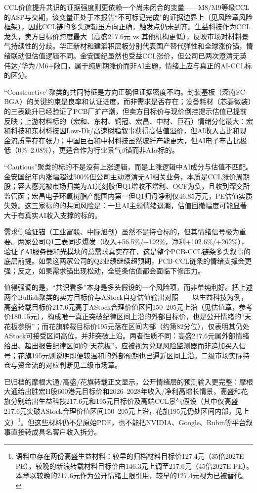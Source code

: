 CCL价值提升共识的证据强度则更依赖一个尚未闭合的变量——M8/M9等级CCL的ASP与交期，该变量正处于本报告``不可标记完成''的证据边界上（见风险章风险框架），因此CCL链的多头逻辑虽方向正确，触发点仍未到齐。生益科技作为CCL龙头，卖方目标价跨度最大（高盛217.6元 vs 其他机构更低），反映市场对材料景气持续性的分歧。华正新材和建滔积层板分别代表国产替代弹性和全球涨价锚，情绪联动但估值逻辑不同。金安国纪虽然也受益CCL涨价，但公司已两次澄清无英伟达/华为/M6+敞口，属于纯周期涨价而非AI主题，情绪上应与真正的AI-CCL标的区分。

``Constructive''聚类的共同特征是方向正确但证据密度不均。封装基板（深南FC-BGA）的关键约束是良率和认证进度，而非需求是否存在；设备耗材（芯碁微装）的三表跳升已经验证了PCB厂扩产潮，但卖方目标价与现价倒挂提示估值已提前反映；上游材料标的（宏和、东材、铜冠、宏昌、中材、巨石）情绪分化最大：宏和科技和东材科技因Low-Dk/高速树脂叙事获得高估值溢价，但AI收入占比和现金流质量存在张力；中国巨石和中材科技虽然玻纤产能更大，但AI电子布占比极低（0\%--2.08\%），更适合作为行业景气$\beta$锚而非AI$\alpha$标的。

``Cautious''聚类的标的不是没有上涨逻辑，而是上涨逻辑中AI成分与估值不匹配。金安国纪年内涨幅超过500\%但公司主动澄清无AI相关业务，本质是CCL涨价周期股；容大感光被市场归类为AI光刻胶但Q1增收不增利、OCF为负，且收到深交所监管函；宏昌电子环氧树脂产能国内第一但Q1归母净利仅46.85万元，PE估值实质失效。这三家标的的共同风险是：一旦AI主题情绪退潮，估值回撤幅度可能显著大于有真实AI收入支撑的标的。

需求侧验证锚（工业富联、中际旭创）虽然不是持仓标的，但其情绪信号极为重要。两家公司Q1三表同步爆发（收入+56.5\%/+192\%，净利+102.6\%/+262\%），验证了AI服务器和光模块的总需求真实存在，这是整个PCB-CCL链条多头叙事的底层前提。如果这两家公司的Q2业绩继续超预期，PCB-CCL链条的情绪支撑会更强；反之，如果需求锚出现松动，全链条估值都会面临下修压力。

值得强调的是，``共识看多''本身是多头假设的一个风险项，而非单纯利好。把上述两个Bullish聚类的卖方目标价与AStock自身估值输出对照——以生益科技为例，高盛转载目标价217.6元高于AStock合理价值区间150--205元上沿（见估值章，参考价180.15元），构成唯一真正突破纪律区间上沿的外部目标价，也是公开情绪的``天花板参照''；而花旗转载目标价195元落在区间内部（约第82分位），仅表明其仍处AStock可接受区间高位，并非突破上沿。两者性质不同：高盛217.6元属外部情绪给出、超出报告纪律区间的``天花板''，应被视为兑现风险监测器而非追加买入信号；花旗195元则说明即便较温和的外部预期也已逼近区间上沿。二级市场实际持仓与资金流的对应判断见二级市场章。

已归档的摩根大通/高盛/花旗转载正文显示，公开情绪层的预测输入更完整：摩根大通给出胜宏H股600港元目标价和2026--2028年收入/净利高增长情景，高盛和花旗分别给出生益科技217.6元和195元目标价及高端CCL景气假设（其中仅高盛217.6元突破AStock合理价值区间150--205元上沿，花旗195元仍处区间内部，见上文）\footnote{语料中存在两份高盛生益材料：较早的归档材料目标价127.4元（35倍2027E PE），较晚的新浪转载材料目标价由146.3元上调至217.6元（45倍2027E PE）。本章以较晚的217.6元作为公开情绪上限引用，较早的127.4元视为已被替代。}。但这些材料仍不是原始PDF，也不能把NVIDIA、Google、Rubin等平台叙事直接转成具名客户收入拆分。

